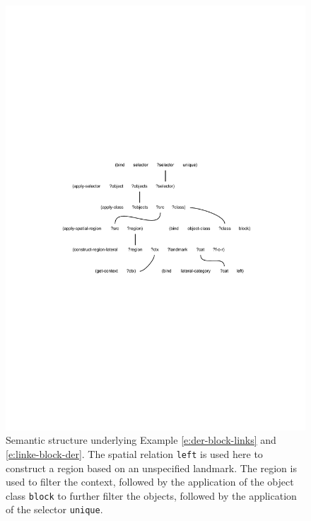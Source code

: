\begin{figure}
\begin{center}
\includegraphics[width=1.0\columnwidth]{figs/semantic-structure-der-block-links}
\end{center}
\caption[Semantic structure example lateral region without landmark]{Semantic structure underlying 
Example \ref{e:der-block-links} and \ref{e:linke-block-der}. 
The spatial relation {\footnotesize\tt left} is used here to construct a
region based on an unspecified landmark. The region is used to filter the context,
followed by the application of the object class {\footnotesize\tt block} to further filter the objects,
followed by the application of the selector {\footnotesize\tt unique}.}
\label{f:semantic-structure-3}
\label{f:semantic-structure}
\end{figure}


